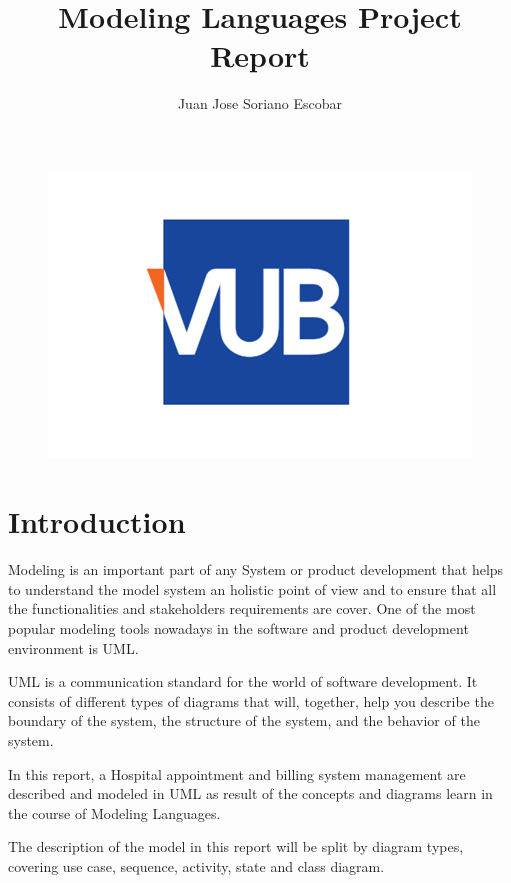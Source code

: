 \documentclass{article}
\begin{document}
        \begin{figure}
            \centering
            \includegraphics[width=0.5\linewidth]{./img/vub.png}
        \end{figure}
        \title{Modeling Languages Project Report}
        \author{Juan Jose Soriano Escobar }
        \maketitle
        \newpage

        \tableofcontents
        \newpage
    
        \begin{appendix}
            \listoffigures
          \end{appendix}
          \newpage
    
    
            \section{Introduction}

            Modeling is an important part of any System or product development that helps to understand the model system an holistic point of view and to ensure that all the functionalities and
            stakeholders requirements are cover. One of the most popular modeling tools nowadays in the software and product development environment is UML.

            UML is a communication standard for the world of software development.  It consists of different types of diagrams that will, together, help you describe the boundary of the system, the structure 
            of the system, and the behavior of the system.

            In this report, a Hospital appointment and billing system management are described and modeled in UML as result of the concepts and diagrams learn in the course of Modeling Languages.

            The description of the model in this report will be split by diagram types, covering use case, sequence, activity, state and class diagram.
             
\end{document}
